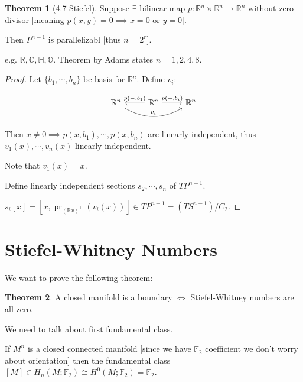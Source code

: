 \documentclass{article}
\theoremstyle{definition}
\newtheorem{theorem}{Theorem}
\begin{document}
    \begin{theorem}
        [4.7 Stiefel] Suppose \(\exists\) bilinear map \(p: \mathbb{R}^n \times \mathbb{R}^n \to \mathbb{R}^n\) without zero divisor [meaning \(p(x,y) = 0 \implies x=0\) or \(y=0\)].

        Then \(P^{n-1}\) is parallelizabl [thus \(n = 2^r\)].
    \end{theorem}

    e.g. \(\mathbb{R}, \mathbb{C} ,\mathbb{H} , \mathbb{O}\). Theorem by Adams states \(n = 1,2,4,8\).

    \begin{proof}
        Let \(\{ b_1, \cdots , b_n \} \) be basis for \(\mathbb{R}^n\). Define \(v_i\):

        \[
            \begin{tikzcd}
                \mathbb{R}^n \ar[rr, bend right, "v_i"] & \mathbb{R}^n \ar[l, "{p(-,b_1)}", swap] \ar[r, "{p(-,b_i)}"] & \mathbb{R}^n
            \end{tikzcd}
        \]

        Then \(x\neq 0 \implies p(x,b_1),\cdots ,p(x,b_n)\) are linearly independent, thus \(v_1(x), \cdots , v_n(x)\) linearly independent.

        Note that \(v_1(x) = x\).

        Define linearly independent sections \(s_2, \cdots , s_n\) of \(TP^{n-1}\).

        \(s_i[x] = [x,  \operatorname{pr}_{(\mathbb{R} x)^{\perp}}(v_i(x))]\in TP^{n-1} = (TS^{n-1}) / C_2\). 
    \end{proof}

    \section*{Stiefel-Whitney Numbers}

    We want to prove the following theorem:

    \begin{theorem}
        A closed manifold is a boundary \(\iff\) Stiefel-Whitney numbers are all zero.
    \end{theorem}

    We need to talk about first fundamental class.

    If \(M^n\) is a closed connected manifold [since we have \(\mathbb{F}_2\) coefficient we don't worry about orientation] then the fundamental class \([M] \in H_n(M;\mathbb{F}_2) \cong H^0(M;\mathbb{F}_2) = \mathbb{F}_2\).
\end{document}
